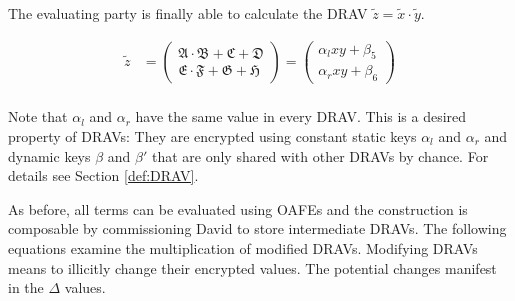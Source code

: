 \noindent{}The evaluating party is finally able to calculate the DRAV
$\widetilde{z} = \widetilde{x} \cdot \widetilde{y}$.

\begin{align*}
  \widetilde{z} & =
  \begin{pmatrix}
    \mathfrak{A} \cdot \mathfrak{B}+\mathfrak{C}+\mathfrak{D}\\
    \mathfrak{E} \cdot \mathfrak{F}+\mathfrak{G}+\mathfrak{H}
  \end{pmatrix}
  =
  \begin{pmatrix}
    \alpha_l xy + \beta_5\\
    \alpha_r xy + \beta_6
  \end{pmatrix}
  \\
\end{align*}

\noindent{}Note that $\alpha_l$ and $\alpha_r$ have the same value in every
DRAV\@. This is a desired property of DRAVs: They are encrypted using constant
static keys $\alpha_l$ and $\alpha_r$ and dynamic keys $\beta$ and $\beta'$ that
are only shared with other DRAVs by chance. For details see Section
\ref{def:DRAV}.

As before, all terms can be evaluated using OAFEs and the construction is
composable by commissioning David to store intermediate DRAVs. The following
equations examine the multiplication of modified DRAVs. Modifying DRAVs means to
illicitly change their encrypted values. The potential changes manifest in the
$\Delta$ values.

